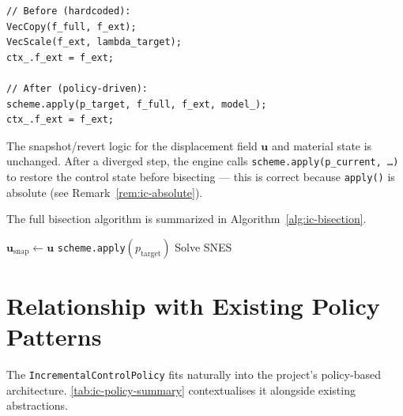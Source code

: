 \begin{lstlisting}
// Before (hardcoded):
VecCopy(f_full, f_ext);
VecScale(f_ext, lambda_target);
ctx_.f_ext = f_ext;

// After (policy-driven):
scheme.apply(p_target, f_full, f_ext, model_);
ctx_.f_ext = f_ext;
\end{lstlisting}

The snapshot/revert logic for the displacement field $\mathbf{u}$ and
material state is unchanged.  After a diverged step, the engine calls
\texttt{scheme.apply(p\_current, \ldots)} to restore the control
state before bisecting --- this is correct because \texttt{apply()}
is absolute (see Remark~\ref{rem:ic-absolute}).

The full bisection algorithm is summarized in
Algorithm~\ref{alg:ic-bisection}.

\begin{algorithm}[ht]
  \caption{Policy-driven bisection engine (\texttt{advance\_to\_p\_}).}
  \label{alg:ic-bisection}
  \SetAlgoLined

  $\mathbf{u}_\text{snap} \gets \mathbf{u}$\;
  \texttt{scheme.apply}$(p_\text{target})$\;
  Solve SNES\;
\end{algorithm}

\section{Relationship with Existing Policy Patterns}
\label{sec:ic-patterns}

The \texttt{IncrementalControlPolicy} fits naturally into the
project's policy-based architecture.  \autoref{tab:ic-policy-summary}
contextualises it alongside existing abstractions.


